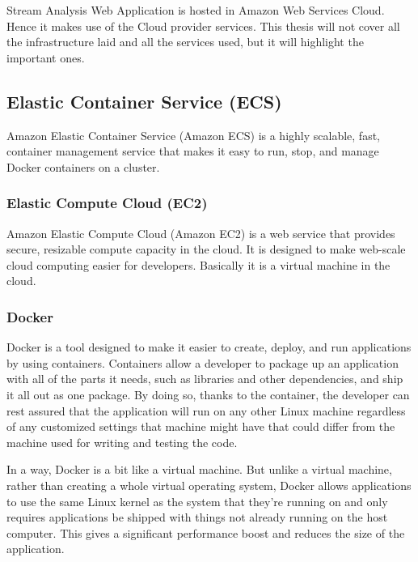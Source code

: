 Stream Analysis Web Application is hosted in Amazon Web Services Cloud. Hence it makes use of the Cloud provider services. This thesis will not cover all the infrastructure laid and all the services used, but it will highlight the important ones.

\subsection{Elastic Container Service (ECS)}
\label{chap:04:03:01}

Amazon Elastic Container Service (Amazon ECS) is a highly scalable, fast, container management service that makes it easy to run, stop, and manage Docker containers on a cluster.\cite{aws-ecs}

\subsubsection{Elastic Compute Cloud (EC2)}
\label{chap:04:03:01:01}

Amazon Elastic Compute Cloud (Amazon EC2) is a web service that provides secure, resizable compute capacity in the cloud. It is designed to make web-scale cloud computing easier for developers.\cite{aws-ec2} Basically it is a virtual machine in the cloud.

\subsubsection{Docker}
\label{chap:04:03:01:02}

Docker is a tool designed to make it easier to create, deploy, and run applications by using containers. Containers allow a developer to package up an application with all of the parts it needs, such as libraries and other dependencies, and ship it all out as one package. By doing so, thanks to the container, the developer can rest assured that the application will run on any other Linux machine regardless of any customized settings that machine might have that could differ from the machine used for writing and testing the code.\cite{docker-description}

In a way, Docker is a bit like a virtual machine. But unlike a virtual machine, rather than creating a whole virtual operating system, Docker allows applications to use the same Linux kernel as the system that they're running on and only requires applications be shipped with things not already running on the host computer. This gives a significant performance boost and reduces the size of the application.\cite{docker-description}


